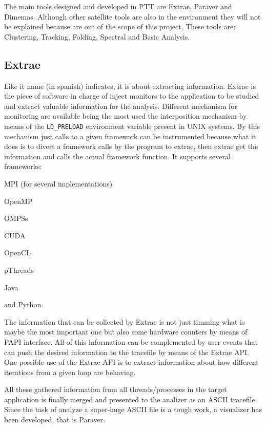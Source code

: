 The main tools designed and developed in PTT are Extrae, Paraver and Dimemas.
Although other satellite tools are also in the environment they will not be
explained because are out of the scope of this project. These tools are: Clustering,
Tracking, Folding, Spectral and Basic Analysis.

\subsection{Extrae}

Like it name (in spanish) indicates, it is about extracting information. Extrae is
the piece of software in charge of inject monitors to the application to
be studied and
extract valuable information for the analysis. Different mechanism for
monitoring are available being the most used the interposition mechanism by
means of the {\tt LD\_PRELOAD} environment variable present in UNIX systems.
By this mechanism just calls to a given framework can be instrumented because
what it does is to divert a framework calls by the program to extrae, then extrae get
the information and calls the actual framework function. It supports several frameworks: 
\begin{enumerate*}[label=(\roman*)]
  \item MPI (for several implementations)
  \item OpenMP
  \item OMPSs
  \item CUDA
  \item OpenCL
  \item pThreads
  \item Java
  \item and Python.
\end{enumerate*}

The information that can be collected by Extrae is not just timming what is maybe
the most important one but also some hardware counters by means of PAPI
interface. All of this information can be complemented by user events that can
push the desired information to the tracefile by means of the Extrae API. One
possible use of the Extrae API is to extract information about how different
iterations from a given loop are behaving.

All these gathered information from all threads/processes in the target
application is finally merged and presented to the analizer as an ASCII
tracefile. Since the task of analyze a super-huge ASCII file is a tough work, a
visualizer has been developed, that is Paraver.

